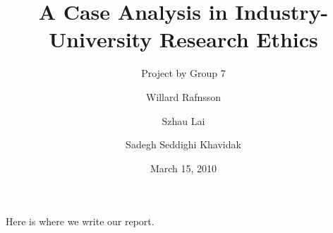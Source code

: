 \documentclass[draft,11pt,openright,monochrome,british,a4paper]{scrartcl}
\begin{document}
\title{A Case Analysis in Industry-University Research Ethics}
\author{Willard Rafnsson \and Szhau Lai \and Sadegh Seddighi Khavidak}
\subtitle{Project by Group 7}
\date{March 15, 2010}
\subject{Ethics, Science \& Society}
\maketitle


Here is where we write our report.

\end{document}
